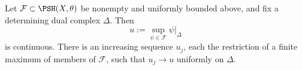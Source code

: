 \begin{proposition}\label{prop:ch23-fixed-skeleton-selection}
Let \(\mathcal F\subset\PSH(X,\theta)\) be nonempty and uniformly bounded
above, and fix a determining dual complex \(\Delta\).  Then
\begin{equation}\label{eq:ch23-fixed-skeleton-sup}
                    u:=\sup_{\psi\in\mathcal F}\psi|_\Delta
\end{equation}
is continuous.  There is an increasing sequence \(u_j\), each the
restriction of a finite maximum of members of \(\mathcal F\), such that
\(u_j\to u\) uniformly on \(\Delta\).
\end{proposition}
